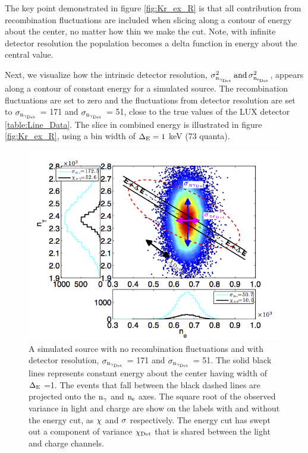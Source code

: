 \noindent The key point demonstrated in figure \ref{fig:Kr_ex_R} is that all contribution from recombination fluctuations are included when slicing along a contour of energy about the center, no matter how thin we make the cut. Note, with infinite detector resolution the population becomes a delta function in energy about the central value.

Next, we visualize how the intrinsic detector resolution, $\rm \sigma_{n_{\gamma_{Det}}}^2 \,and\, \sigma_{n_{e_{Det}}}^2 $, appears along a contour of constant energy for a simulated \KrCal source. The recombination fluctuations are set to zero and the fluctuations from detector resolution are set to $\rm \sigma_{n_{\gamma_{Det}}}$ = 171 and $\rm \sigma_{n_{\gamma_{Det}}}$ = 51, close to the true values of the LUX detector \ref{table:Line_Data}. The slice in combined energy is illustrated in figure \ref{fig:Kr_ex_R}, using a bin width of $\rm \Delta_E = 1$ keV (73 quanta).

\renewcommand{\baselinestretch}{1}
\small\normalsize
 \begin{figure}[h!]\centering
\includegraphics[width=160mm]{Chapter_Flucs/Figures/Ex_Plots/EX_Stat_Kr_.png}
\caption{A simulated \KrCal source with no recombination fluctuations and with detector resolution, $\rm \sigma_{n_{\gamma_{Det}}}$ = 171 and $\rm \sigma_{n_{\gamma_{Det}}}$ = 51. The solid black lines represents constant energy about the center having width of $\rm \Delta_E$ =1. The events that fall between the black dashed lines are projected onto the $\rm n_\gamma$ and $\rm n_e$ axes. The square root of the observed variance in light and charge are show on the labels with and without the energy cut, as $\rm \chi$ and $\rm \sigma$ respectively. The energy cut has swept out a component of variance $\rm \chi_{Det}$ that is shared between the light and charge channels. }
\label{fig:Kr_ex_Stat}
\end{figure}
\renewcommand{\baselinestretch}{2}
\small\normalsize

